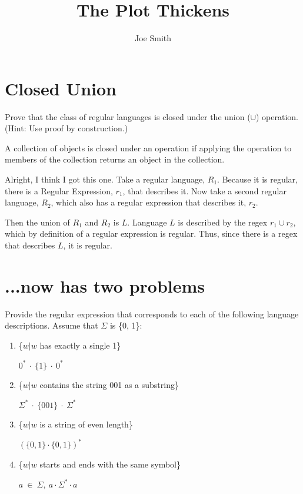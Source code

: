 \documentclass[10pt,reqno,sumlimits]{amsart}
\theoremstyle{plain}
\theoremstyle{definition}
\newcommand{\1}{{\bf 1}}
\numberwithin{equation}{section}
\begin{document}
\title[Assignment 2]{The Plot Thickens}
\author{Joe Smith}



\maketitle



\section {Closed Union}
Prove that the class of regular languages is closed under the union ($\cup$) operation. (Hint: Use proof by construction.)

A collection of objects is closed under an operation if applying the operation to members of the collection returns an object in the collection.

Alright, I think I got this one. Take a regular language, $R_1$. Because it is regular, there is a Regular Expression, $r_1$, that describes it. Now take a second regular language, $R_2$, which also has a regular expression that describes it, $r_2$.

Then the union of $R_1$ and $R_2$ is $L$. Language $L$ is described by the regex $r_1 \cup r_2$, which by definition of a regular expression is regular. Thus, since there is a regex that describes $L$, it is regular.

\section{...now has two problems}
Provide the regular expression that corresponds to each of the following language descriptions. Assume that $\Sigma$ is \{0, 1\}:

\begin{enumerate}
\item \{$w|w$ has exactly a single 1\}

\hspace{0.5in} $0^*\ \cdot\ \{1\}\ \cdot\ 0^*$

\item \{$w|w$ contains the string 001 as a substring\}

\hspace{0.5in} $\Sigma^*\ \cdot\ \{001\}\ \cdot\ \Sigma^*$

\item \{$w|w$ is a string of even length\}

\hspace{0.5in} $ (\{0,1\} \cdot \{0,1\})^*$

\item \{$w|w$ starts and ends with the same symbol\}

\hspace{0.5in} $ a\ \in\ \Sigma,\ a \cdot \Sigma^* \cdot a  $

\end{enumerate}
\end{document}
